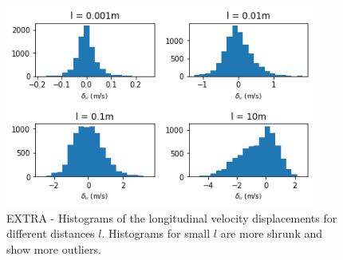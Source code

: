 \documentclass[11pt,titlepage]{article}
\begin{document}
\begin{center}
	\begin{figure} [h]
		\centering
		\includegraphics[width = 4in]{./figures/ex1_6_2.png}
		\caption{EXTRA - Histograms of the longitudinal velocity displacements for different distances $l$. Histograms for small $l$ are more shrunk and show more outliers.}
		\label{fig_extra}
	\end{figure}
\end{center}
\end{document}
